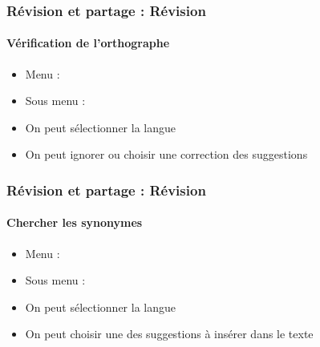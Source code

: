 \documentclass[xcolor=table]{beamer}
\begin{document}
\begin{frame}[t]
\frametitle{Révision et partage : Révision}
\framesubtitle{Vérification de l'orthographe}

\begin{minipage}{0.49\textwidth}
	\begin{itemize}
		\item Menu : 
		\item Sous menu : 
		\item On peut sélectionner la langue 
		\item On peut ignorer ou choisir une correction des suggestions
	\end{itemize}
\end{minipage}
\begin{minipage}{0.50\textwidth}
\end{minipage}

\end{frame}

\begin{frame}[t]
\frametitle{Révision et partage : Révision}
\framesubtitle{Chercher les synonymes}

\begin{minipage}{0.49\textwidth}
	\begin{itemize}
		\item Menu : 
		\item Sous menu : 
		\item On peut sélectionner la langue 
		\item On peut choisir une des suggestions à insérer dans le texte
	\end{itemize}
\end{minipage}
\begin{minipage}{0.50\textwidth}
\end{minipage}

\end{frame}

\end{document}
